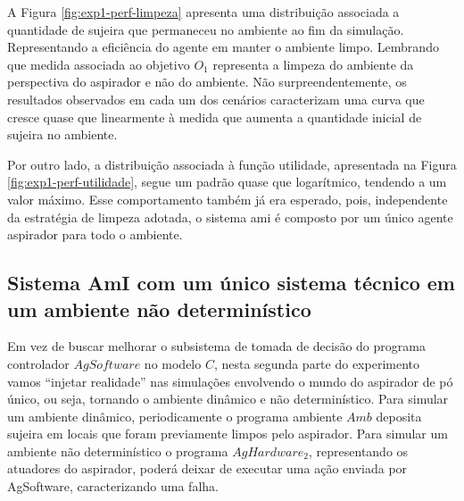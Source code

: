 A Figura \ref{fig:exp1-perf-limpeza} apresenta uma distribuição associada a quantidade de sujeira que permaneceu no ambiente ao fim da simulação. Representando a eficiência do agente em manter o ambiente limpo. Lembrando que medida associada ao objetivo $O_1$ representa a limpeza do ambiente da perspectiva do aspirador e não do ambiente. Não surpreendentemente, os resultados observados em cada um dos cenários caracterizam uma curva que cresce quase que linearmente à medida que aumenta a quantidade inicial de sujeira no ambiente.

\begin{figure}[h!]
    \centering
\end{figure}

Por outro lado, a distribuição associada à função utilidade, apresentada na Figura \ref{fig:exp1-perf-utilidade}, segue um padrão quase que logarítmico, tendendo a um valor máximo. Esse comportamento também já era esperado, pois, independente da estratégia de limpeza adotada, o sistema \acrshort{ami} é composto por um único agente aspirador para todo o ambiente. 


\subsection{Sistema AmI com um único sistema técnico em um ambiente não determinístico}
\label{sec:exp-dinamico}
Em vez de buscar melhorar o subsistema de tomada de decisão do programa controlador $AgSoftware$ no modelo $C$, nesta segunda parte do experimento vamos “injetar realidade” nas simulações envolvendo o mundo do aspirador de pó único, ou seja, tornando o ambiente dinâmico e não determinístico. Para simular um ambiente dinâmico, periodicamente o programa ambiente $Amb$ deposita sujeira em locais que foram previamente limpos pelo aspirador. Para simular um ambiente não determinístico o programa $AgHardware_2$, representando os atuadores do aspirador, poderá deixar de executar uma ação enviada por AgSoftware, caracterizando uma falha.


